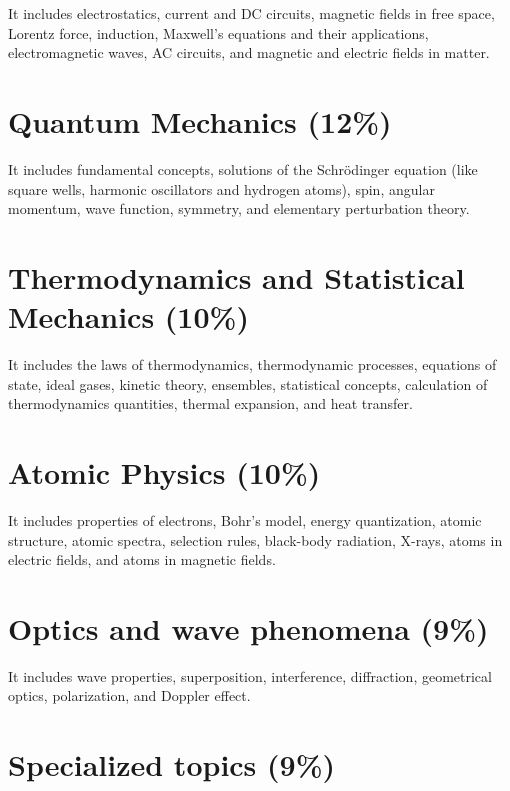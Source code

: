 \documentclass[12pt,a4paper]{article}
\begin{document}
It includes electrostatics, current and DC circuits, magnetic fields in free space, Lorentz force, induction, Maxwell's equations and their applications, electromagnetic waves, AC circuits, and magnetic and electric fields in matter.

\section{Quantum Mechanics (12\%)}

It includes fundamental concepts, solutions of the Schr\"{o}dinger equation (like square wells, harmonic oscillators and hydrogen atoms), spin, angular momentum, wave function, symmetry, and elementary perturbation theory.


\section{Thermodynamics and Statistical Mechanics (10\%)}

It includes the laws of thermodynamics, thermodynamic processes, equations of state, ideal gases, kinetic theory, ensembles, statistical concepts, calculation of thermodynamics quantities, thermal expansion, and heat transfer.


\section{Atomic Physics (10\%)}

It includes properties of electrons, Bohr's model, energy quantization, atomic structure, atomic spectra, selection rules, black-body radiation, X-rays, atoms in electric fields, and atoms in magnetic fields.


\section{Optics and wave phenomena (9\%)}

It includes wave properties, superposition, interference, diffraction, geometrical optics, polarization, and Doppler effect.


\section{Specialized topics (9\%)}
\end{document}
